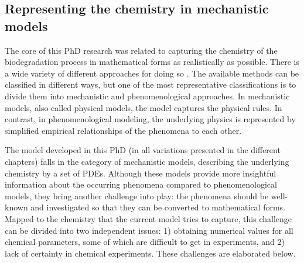 \subsection{Representing the chemistry in mechanistic models} \label{sec:conclusion_mechanistic}


The core of this PhD research was related to capturing the chemistry of the biodegradation process in mathematical forms as realistically as possible. There is a wide variety of different approaches for doing so \cite{Abdalla2020}. The available methods can be classified in different ways, but one of the most representative classifications is to divide them into mechanistic and phenomenological approaches. In mechanistic models, also called physical models, the model captures the physical rules. In contrast, in phenomenological modeling, the underlying physics is represented by simplified empirical relationships of the phenomena to each other.

The model developed in this PhD (in all variations presented in the different chapters) falls in the category of mechanistic models, describing the underlying chemistry by a set of \gls{PDE}s. Although these models provide more insightful information about the occurring phenomena compared to phenomenological models, they bring another challenge into play: the phenomena should be well-known and investigated so that they can be converted to mathematical forms. Mapped to the chemistry that the current model tries to capture, this challenge can be divided into two independent issues: 1) obtaining numerical values for all chemical parameters, some of which are difficult to get in experiments, and 2) lack of certainty in chemical experiments. These challenges are elaborated below.

